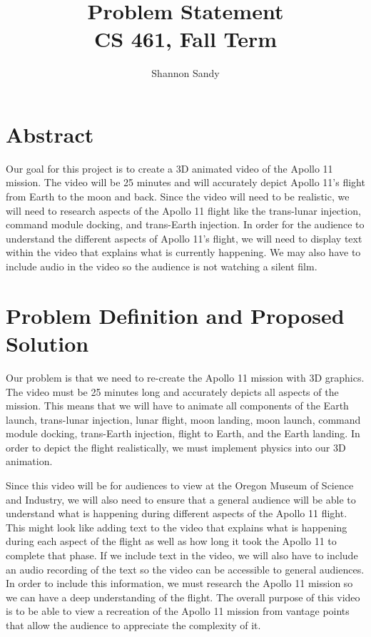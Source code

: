 \documentclass[journal,10pt,onecolumn,draftclsnofoot,]{IEEEtran}
\begin{document}
\title{Problem Statement\\
    \large CS 461, Fall Term}
\author{\large Shannon Sandy}


\maketitle

\section{Abstract}
Our goal for this project is to create a 3D animated video of the Apollo 11 mission. The video will be 25 minutes and will accurately depict Apollo 11's flight from Earth to the moon and back. Since the video will need to be realistic, we will need to research aspects of the Apollo 11 flight like the trans-lunar injection, command module docking, and trans-Earth injection. In order for the audience to understand the different aspects of Apollo 11’s flight, we will need to display text within the video that explains what is currently happening. We may also have to include audio in the video so the audience is not watching a silent film.
\newpage
\section{Problem Definition and Proposed Solution}
Our problem is that we need to re-create the Apollo 11 mission with 3D graphics. The video must be 25 minutes long and accurately depicts all aspects of the mission. This means that we will have to animate all components of the Earth launch, trans-lunar injection, lunar flight, moon landing, moon launch, command module docking, trans-Earth injection, flight to Earth, and the Earth landing. In order to depict the flight realistically, we must implement physics into our 3D animation. 

Since this video will be for audiences to view at the Oregon Museum of Science and Industry, we will also need to ensure that a general audience will be able to understand what is happening during different aspects of the Apollo 11 flight. This might look like adding text to the video that explains what is happening during each aspect of the flight as well as how long it took the Apollo 11 to complete that phase. If we include text in the video, we will also have to include an audio recording of the text so the video can be accessible to general audiences. In order to include this information, we must research the Apollo 11 mission so we can have a deep understanding of the flight. The overall purpose of this video is to be able to view a recreation of the Apollo 11 mission from vantage points that allow the audience to appreciate the complexity of it.
\end{document}
